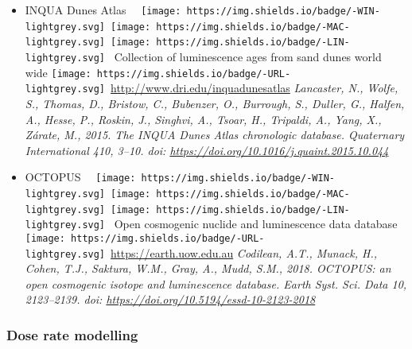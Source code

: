 \documentclass[]{article}
\providecommand{\tightlist}{%
  \setlength{\itemsep}{0pt}\setlength{\parskip}{0pt}}
\begin{document}
\begin{itemize}
\tightlist
\item
  INQUA Dunes Atlas ~~\texttt{[image: https://img.shields.io/badge/-WIN-lightgrey.svg]}~\texttt{[image: https://img.shields.io/badge/-MAC-lightgrey.svg]}~\texttt{[image: https://img.shields.io/badge/-LIN-lightgrey.svg]}~
  Collection of luminescence ages from sand dunes world wide
  \texttt{[image: https://img.shields.io/badge/-URL-lightgrey.svg]}~\url{http://www.dri.edu/inquadunesatlas}
  \emph{Lancaster, N., Wolfe, S., Thomas, D., Bristow, C., Bubenzer, O., Burrough, S., Duller, G., Halfen, A., Hesse, P., Roskin, J., Singhvi, A., Tsoar, H., Tripaldi, A., Yang, X., Zárate, M., 2015. The INQUA Dunes Atlas chronologic database. Quaternary International 410, 3--10. doi: \url{https://doi.org/10.1016/j.quaint.2015.10.044}}
\item
  OCTOPUS ~~\texttt{[image: https://img.shields.io/badge/-WIN-lightgrey.svg]}~\texttt{[image: https://img.shields.io/badge/-MAC-lightgrey.svg]}~\texttt{[image: https://img.shields.io/badge/-LIN-lightgrey.svg]}~
  Open cosmogenic nuclide and luminescence data database
  \texttt{[image: https://img.shields.io/badge/-URL-lightgrey.svg]}~\url{https://earth.uow.edu.au}
  \emph{Codilean, A.T., Munack, H., Cohen, T.J., Saktura, W.M., Gray, A., Mudd, S.M., 2018. OCTOPUS: an open cosmogenic isotope and luminescence database. Earth Syst. Sci. Data 10, 2123--2139. doi: \url{https://doi.org/10.5194/essd-10-2123-2018}}
\end{itemize}

\hypertarget{dose-rate-modelling}{%
\subsubsection{Dose rate modelling}\label{dose-rate-modelling}}
\end{document}

